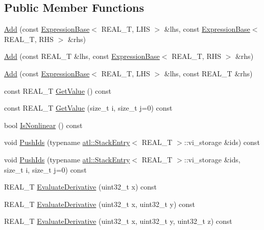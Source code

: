 \subsection*{Public Member Functions}
\begin{DoxyCompactItemize}
\item 
\hyperlink{structatl_1_1_add_ae5adbfbec484c5c3d723961c507cceff}{Add} (const \hyperlink{structatl_1_1_expression_base}{Expression\+Base}$<$ R\+E\+A\+L\+\_\+\+T, L\+H\+S $>$ \&lhs, const \hyperlink{structatl_1_1_expression_base}{Expression\+Base}$<$ R\+E\+A\+L\+\_\+\+T, R\+H\+S $>$ \&rhs)
\item 
\hyperlink{structatl_1_1_add_a9e21358db0817bce5b9c8043defc1bb6}{Add} (const R\+E\+A\+L\+\_\+\+T \&lhs, const \hyperlink{structatl_1_1_expression_base}{Expression\+Base}$<$ R\+E\+A\+L\+\_\+\+T, R\+H\+S $>$ \&rhs)
\item 
\hyperlink{structatl_1_1_add_af3db07d03f92baf1728551fcda736ee2}{Add} (const \hyperlink{structatl_1_1_expression_base}{Expression\+Base}$<$ R\+E\+A\+L\+\_\+\+T, L\+H\+S $>$ \&lhs, const R\+E\+A\+L\+\_\+\+T \&rhs)
\item 
const R\+E\+A\+L\+\_\+\+T \hyperlink{structatl_1_1_add_a2c34acd36affef45b59ca3e2cbcf81aa}{Get\+Value} () const 
\item 
const R\+E\+A\+L\+\_\+\+T \hyperlink{structatl_1_1_add_a13e0ac75627c1747496f5aac500eb128}{Get\+Value} (size\+\_\+t i, size\+\_\+t j=0) const 
\item 
bool \hyperlink{structatl_1_1_add_a51e2295c5057bf50404e96949fb16912}{Is\+Nonlinear} () const 
\item 
void \hyperlink{structatl_1_1_add_a52a005a7a1dc1f38d77d6f142f3bea64}{Push\+Ids} (typename \hyperlink{structatl_1_1_stack_entry}{atl\+::\+Stack\+Entry}$<$ R\+E\+A\+L\+\_\+\+T $>$\+::vi\+\_\+storage \&ids) const 
\item 
void \hyperlink{structatl_1_1_add_a27cba5452b589a46fd4d6ab2abc1a7ea}{Push\+Ids} (typename \hyperlink{structatl_1_1_stack_entry}{atl\+::\+Stack\+Entry}$<$ R\+E\+A\+L\+\_\+\+T $>$\+::vi\+\_\+storage \&ids, size\+\_\+t i, size\+\_\+t j=0) const 
\item 
R\+E\+A\+L\+\_\+\+T \hyperlink{structatl_1_1_add_af08ab2cb8bc02783ac33756b91f5474d}{Evaluate\+Derivative} (uint32\+\_\+t x) const 
\item 
R\+E\+A\+L\+\_\+\+T \hyperlink{structatl_1_1_add_a156da3b3329007671fa005cfedbdf152}{Evaluate\+Derivative} (uint32\+\_\+t x, uint32\+\_\+t y) const 
\item 
R\+E\+A\+L\+\_\+\+T \hyperlink{structatl_1_1_add_ad6c38c9c3ef3bdb2eef2bc4b5832002f}{Evaluate\+Derivative} (uint32\+\_\+t x, uint32\+\_\+t y, uint32\+\_\+t z) const 

\end{DoxyCompactItemize}
